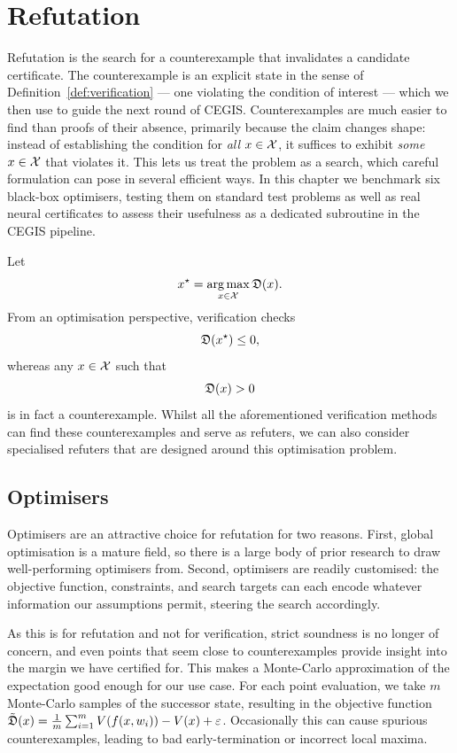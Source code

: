 \chapter{Refutation}
\label{chap:refutation}

Refutation is the search for a counterexample that invalidates a candidate certificate. The counterexample is an explicit state in the sense of Definition~\ref{def:verification} --- one violating the condition of interest --- which we then use to guide the next round of CEGIS. Counterexamples are much easier to find than proofs of their absence, primarily because the claim changes shape: instead of establishing the condition for \emph{all} $x \in \mathcal{X}$, it suffices to exhibit \emph{some} $x \in \mathcal{X}$ that violates it. This lets us treat the problem as a search, which careful formulation can pose in several efficient ways. In this chapter we benchmark six black-box optimisers, testing them on standard test problems as well as real neural certificates to assess their usefulness as a dedicated subroutine in the CEGIS pipeline.


Let 
\[
x^\star = \operatorname*{arg\,max}_{x \in \mathcal{X}} \mathfrak{D}(x).
\]
From an optimisation perspective, verification checks
\[
\mathfrak{D}(x^\star) \leq 0,
\]
whereas any $x \in \mathcal{X}$ such that
\[
\mathfrak{D}(x) > 0
\]
is in fact a counterexample. Whilst all the aforementioned verification methods can find these counterexamples and serve as refuters, we can also consider specialised refuters that are designed around this optimisation problem.

\section{Optimisers}

Optimisers are an attractive choice for refutation for two reasons. First, global optimisation is a mature field, so there is a large body of prior research to draw well-performing optimisers from. Second, optimisers are readily customised: the objective function, constraints, and search targets can each encode whatever information our assumptions permit, steering the search accordingly.

As this is for refutation and not for verification, strict soundness is no longer of concern, and even points that seem close to counterexamples provide insight into the margin we have certified for. This makes a Monte-Carlo approximation of the expectation good enough for our use case. For each point evaluation, we take $m$ Monte-Carlo samples of the successor state, resulting in the objective function $\tilde{\mathfrak{D}}(x) = \frac{1}{m} \sum_{i=1}^{m} V(f(x, w_i)) - V(x) + \varepsilon$. Occasionally this can cause spurious counterexamples, leading to bad early-termination or incorrect local maxima.


